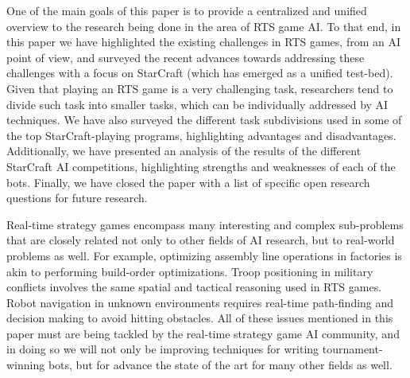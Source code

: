 \documentclass[journal]{IEEEtran}
\begin{document}
One of the main goals of this paper is to provide a centralized and unified overview to the research being done in the area of RTS game AI. To that end, in this paper we have  highlighted the existing challenges in RTS games, from an AI point of view, and surveyed the recent advances towards addressing these challenges with a focus on StarCraft (which has emerged as a unified test-bed). Given that playing an RTS game is a very challenging task, researchers tend to divide such task into smaller tasks, which can be individually addressed by AI techniques. We have also surveyed the different task subdivisions used in some of the top StarCraft-playing programs, highlighting advantages and disadvantages. Additionally, we have presented an analysis of the results of the different StarCraft AI competitions, highlighting strengths and weaknesses of each of the bots. Finally, we have closed the paper with a list of specific open research questions for future research.

Real-time strategy games encompass many interesting and complex
sub-problems that are closely related not only to other fields of AI
research, but to real-world problems as well. For example, optimizing assembly line operations in factories is akin to performing build-order optimizations. 
Troop positioning in military conflicts involves the same spatial and
tactical reasoning used in RTS games. Robot navigation in unknown environments requires real-time path-finding and decision making to avoid hitting obstacles.
All of these issues mentioned in this paper must are being tackled by
the real-time strategy game AI community, and in doing so we will not
only be improving techniques for writing tournament-winning bots, but
for advance the state of the art for many other fields as well.






\end{document}
